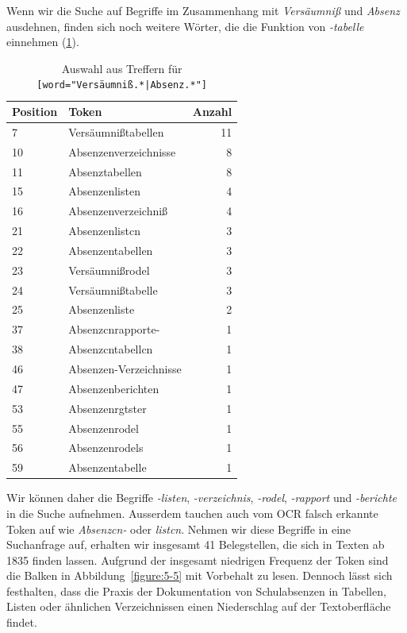 Wenn wir die Suche auf Begriffe im Zusammenhang mit \textit{Versäumniß} und \textit{Absenz} ausdehnen, finden sich noch weitere Wörter, die die Funktion von \textit{-tabelle} einnehmen (\cref{table:5-4}).

\hspace{1cm}

\renewcommand{\arraystretch}{1}{
    \begin{table}[!ht]
        \centering
        \begin{tabular}{llr} \toprule
            \textbf{Position} & \textbf{Token} & \textbf{Anzahl} \\ \midrule 
            7 & Versäumnißtabellen & 11 \\
            10 & Absenzenverzeichnisse & 8 \\
            11 & Absenztabellen & 8 \\
            15 & Absenzenlisten & 4 \\
            16 & Absenzenverzeichniß & 4 \\
            21 & Absenzenlistcn & 3 \\
            22 & Absenzentabellen & 3 \\
            23 & Versäumnißrodel & 3 \\
            24 & Versäumnißtabelle & 3 \\
            25 & Absenzenliste & 2 \\
            37 & Absenzcnrapporte- & 1 \\
            38 & Absenzcntabellcn & 1 \\
            46 & Absenzen-Verzeichnisse & 1 \\
            47 & Absenzenberichten & 1 \\
            53 & Absenzenrgtster & 1 \\
            55 & Absenzenrodel & 1 \\
            56 & Absenzenrodels & 1 \\
            59 & Absenzentabelle & 1 \\
            \bottomrule
        \end{tabular}
        \caption{Auswahl aus Treffern für \texttt{[word=\-"Versäumniß.*|Absenz.*"]}}
        \label{table:5-4}
    \end{table}
}

Wir können daher die Begriffe \textit{-listen}, \textit{-verzeichnis}, \textit{-rodel}, \textit{-rapport} und \textit{-berichte} in die Suche aufnehmen. Ausserdem tauchen auch vom OCR falsch erkannte Token auf wie \textit{Absenzcn-} oder \textit{listcn}. Nehmen wir diese Begriffe in eine Suchanfrage auf, erhalten wir insgesamt 41 Belegstellen, die sich in Texten ab 1835 finden lassen. Aufgrund der insgesamt niedrigen Frequenz der Token sind die Balken in Abbildung~\ref{figure:5-5} mit Vorbehalt zu lesen. Dennoch lässt sich festhalten, dass die Praxis der Dokumentation von Schulabsenzen in Tabellen, Listen oder ähnlichen Verzeichnissen einen Niederschlag auf der Textoberfläche findet.

